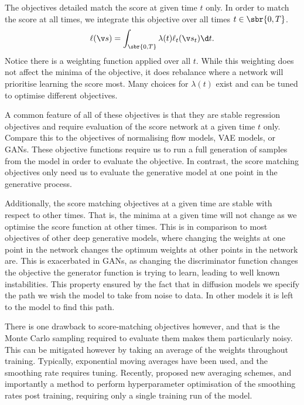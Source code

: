 The objectives detailed match the score at given time \(t\) only. 
In order to match the score at all times, we integrate this objective over all times \(t \in \sbr{0, T}\).
\[\ell(\scorenet{}) = \int_{\sbr{0, T}} \lambda(t) \ell_t(\scorenett{}) \d t.\]
Notice there is a weighting function applied over all \(t\).
While this weighting does not affect the minima of the objective, it does rebalance where a network will prioritise learning the score most.
Many choices for \(\lambda(t)\) exist and can be tuned to optimise different objectives.

A common feature of all of these objectives is that they are
\1 stable regression objectives and
\2 require evaluation of the score network at a given time \(t\) only.
\0
Compare this to the objectives of normalising flow models, VAE models, or GANs.
These objective functions require us to run a full generation of samples from the model in order to evaluate the objective.
In contrast, the score matching objectives only need us to evaluate the generative model at one point in the generative process.

Additionally, the score matching objectives at a given time are stable with respect to other times.
That is, the minima at a given time will not change as we optimise the score function at other times.
This is in comparison to most objectives of other deep generative models, where changing the weights at one point in the network changes the optimum weights at other points in the network are.
This is exacerbated in GANs, as changing the discriminator function changes the objective the generator function is trying to learn, leading to well known instabilities.
This property ensured by the fact that in diffusion models we specify the path we wish the model to take from noise to data.
In other models it is left to the model to find this path.

There is one drawback to score-matching objectives however, and that is the Monte Carlo sampling required to evaluate them makes them particularly noisy.
This can be mitigated however by taking an average of the weights throughout training.
Typically, exponential moving averages have been used, and the smoothing rate requires tuning.
Recently, \textcite{karras2023analyzing} proposed new averaging schemes, and importantly a method to perform hyperparameter optimisation of the smoothing rates post training, requiring only a single training run of the model.

